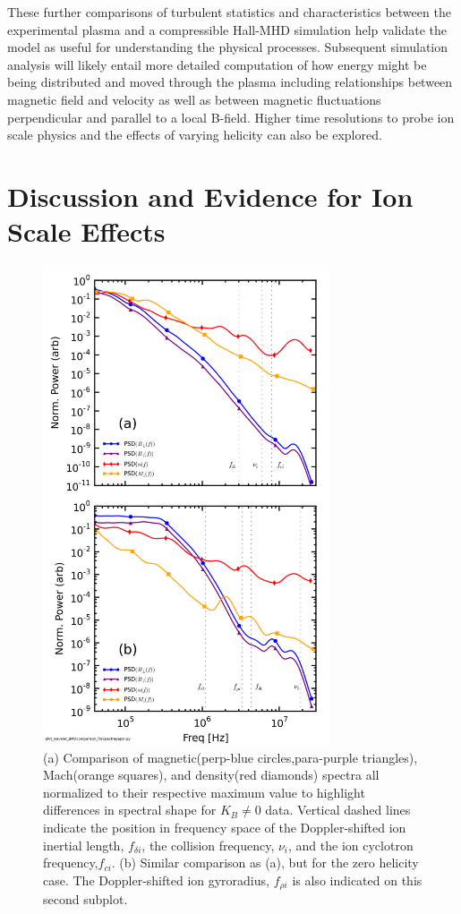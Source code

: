 \documentclass[aip,prl,amsmath,amssymb,reprint,superscriptaddress]{revtex4-1} %
\begin{document}
These further comparisons of turbulent statistics and characteristics between the experimental plasma and a compressible Hall-MHD simulation help validate the model as useful for understanding the physical processes. Subsequent simulation analysis will likely entail more detailed computation of how energy might be being distributed and moved through the plasma including relationships between magnetic field and velocity as well as between magnetic fluctuations perpendicular and parallel to a local B-field. Higher time resolutions to probe ion scale physics and the effects of varying helicity can also be explored.

\section{Discussion and Evidence for Ion Scale Effects}\label{sec:ionscale}

\begin{figure}[!htbp]
\centerline{
\includegraphics[width=8.5cm]{BvsDensvsFlowspec_1mWb_and_0mWbcomp_40t60us}}
\caption{\label{fig:BMD_comp} (a) Comparison of magnetic(perp-blue circles,para-purple triangles), Mach(orange squares), and density(red diamonds) spectra all normalized to their respective maximum value to highlight differences in spectral shape for $K_{B}\neq 0$ data. Vertical dashed lines indicate the position in frequency space of the Doppler-shifted ion inertial length, $f_{\delta i}$, the collision frequency, $\nu_i$, and the ion cyclotron frequency,$f_{ci}$. (b) Similar comparison as (a), but for the zero helicity case. The Doppler-shifted ion gyroradius, $f_{\rho i}$ is also indicated on this second subplot.}
\end{figure}
\end{document}
